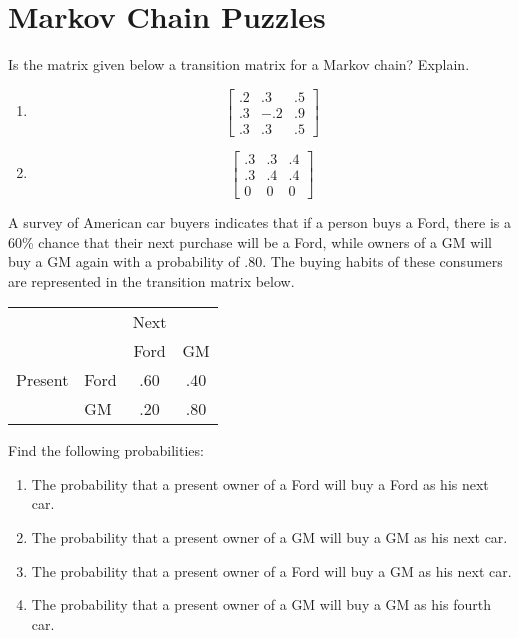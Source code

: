 \section{Markov Chain Puzzles}

\begin{puzzle}
    Is the matrix given below a transition matrix for a Markov chain? Explain.
    \begin{enumerate}
        \item \[ \begin{bmatrix}
                      .2 & .3  & .5 \\
                      .3 & -.2 & .9 \\
                      .3 & .3  & .5
                  \end{bmatrix}\]
        \item \[ \begin{bmatrix}
                      .3 & .3 & .4 \\
                      .3 & .4 & .4 \\
                      0  & 0  & 0
                  \end{bmatrix}\]
    \end{enumerate}
\end{puzzle}

\begin{puzzle}
    A survey of American car buyers indicates that if a person buys a Ford, there is a 60\% chance that their next purchase will be a Ford, while owners of a GM will buy a GM again with a probability of .80. The buying habits of these consumers are represented in the transition matrix below.

    \begin{center}
        \begin{tabular}{ll|cc}
                    &      & Next &     \\
                    &      & Ford & GM  \\
            \hline
            Present & Ford & .60  & .40 \\
                    & GM   & .20  & .80 \\
        \end{tabular}
    \end{center}


    Find the following probabilities:
    \begin{enumerate}
        \item The probability that a present owner of a Ford will buy a Ford as his next car.
        \item The probability that a present owner of a GM will buy a GM as his next car.
        \item The probability that a present owner of a Ford will buy a GM as his next car.
        \item The probability that a present owner of a GM will buy a GM as his fourth car.
    \end{enumerate}
\end{puzzle}

